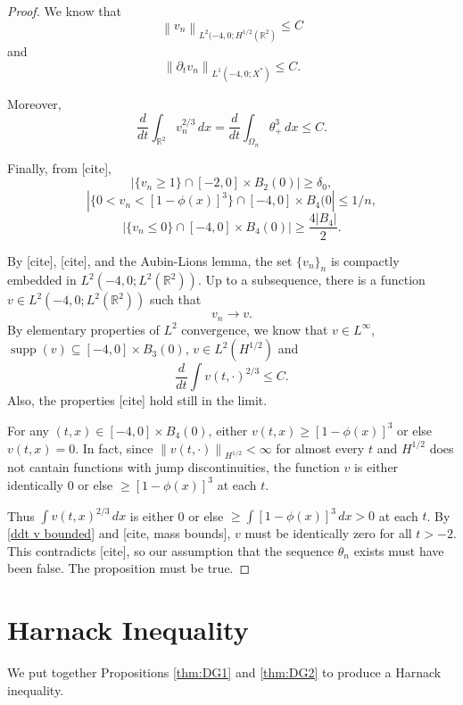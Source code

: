 \documentclass[11pt]{amsart}
\theoremstyle{remark}
\theoremstyle{definition}
\newcommand{\R}{\mathbb{R}}
\newcommand{\norm}[1]{\left\lVert#1\right\rVert}
\newcommand{\abs}[1]{\left\lvert #1 \right\rvert}
\DeclareMathOperator{\supp}{supp}
\newcommand{\del}{\partial}
\newcommand{\ddt}{\frac{d}{dt}}
\begin{document}
\begin{proof}
We know that
\[ \norm{ v_n }_{L^2(-4,0; H^{1/2}(\R^2)} \leq C \]
and
\[ \norm{ \del_t v_n }_{L^1(-4,0; X^*)} \leq C. \]

Moreover, 
\[ \ddt \int_{\R^2} v_n^{2/3} \,dx = \ddt \int_{\Omega_n} \theta_+^3 \,dx \leq C. \]

Finally, from [cite],
\[ \abs{\{v_n \geq 1\} \cap [-2,0]\times B_2(0)} \geq \delta_0, \]
\[ \abs{\{0 < v_n < [1-\phi(x)]^3\} \cap [-4,0]\times B_4(0} \leq 1/n, \]
\[ \abs{\{v_n \leq 0\} \cap [-4,0]\times B_4(0)} \geq \frac{4 |B_4|}{2}. \]

By [cite], [cite], and the Aubin-Lions lemma, the set $\{v_n\}_n$ is compactly embedded in $L^2(-4,0; L^2(\R^2))$.  Up to a subsequence, there is a function $v \in L^2(-4,0; L^2(\R^2))$ such that
\[ v_n \to v. \]
By elementary properties of $L^2$ convergence, we know that $v \in L^\infty$, $\supp(v) \subseteq [-4,0]\times B_3(0)$, $v \in L^2(H^{1/2})$ and 
\begin{equation} \label{ddt v bounded} \ddt \int v(t,\cdot)^{2/3} \leq C. \end{equation} 
Also, the properties [cite] hold still in the limit.  

For any $(t,x) \in [-4,0]\times B_4(0)$, either $v(t,x) \geq [1 - \phi(x)]^3$ or else $v(t,x) = 0$.  In fact, since $\norm{v(t,\cdot)}_{H^{1/2}} < \infty$ for almost every $t$ and $H^{1/2}$ does not cantain functions with jump discontinuities, the function $v$ is either identically 0 or else $\geq [1-\phi(x)]^3$ at each $t$.  

Thus $\int v(t,x)^{2/3} \,dx$ is either 0 or else $\geq \int [1-\phi(x)]^3 \,dx > 0$ at each $t$.  By \eqref{ddt v bounded} and [cite, mass bounds], $v$ must be identically zero for all $t > -2$.  This contradicts [cite], so our assumption that the sequence $\theta_n$ exists must have been false.  The proposition must be true.  

\end{proof}



\section{Harnack Inequality} \label{sec:harnack}

We put together Propositions \ref{thm:DG1} and \ref{thm:DG2} to produce a Harnack inequality.  
\end{document}
